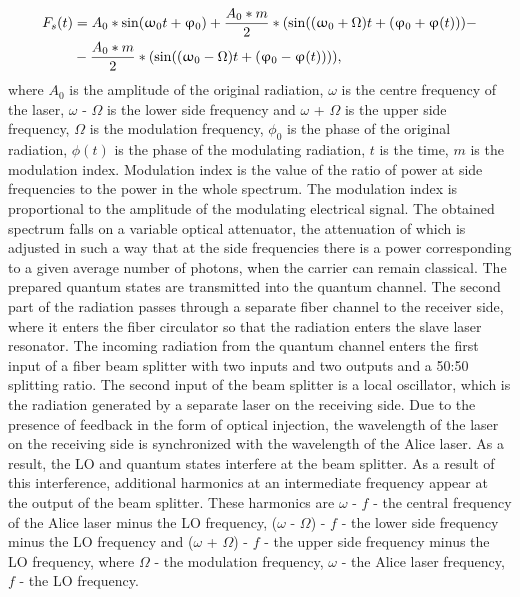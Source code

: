 {\begin{align}
\label{eq:spectrum seed}
F_s(t) & = A_0 * \sin(\omega_0 t + \phi_0) + \frac{A_0 * m}{2} * (\sin((\omega_0 + \Omega)t + (\phi_0 + \phi (t))) - \notag \\\
&- \frac{A_0 * m}{2} * (\sin((\omega_0 - \Omega)t + (\phi_0 - \phi (t)))),
\end{align} where $A_0$ is the amplitude of the original radiation, $\omega$ is the centre frequency of the laser, $\omega$ - $\Omega$ is the lower side frequency and $\omega$ + $\Omega$ is the upper side frequency, $\Omega$ is the modulation frequency, $\phi_0$ is the phase of the original radiation, $\phi(t)$ is the phase of the modulating radiation, $t$ is the time, $m$ is the modulation index. Modulation index is the value of the ratio of power at side frequencies to the power in the whole spectrum. The modulation index is proportional to the amplitude of the modulating electrical signal.  The obtained spectrum falls on a variable optical attenuator, the attenuation of which is adjusted in such a way that at the side frequencies there is a power corresponding to a given average number of photons, when the carrier can remain classical. The prepared quantum states are transmitted into the quantum channel. 
The second part of the radiation passes through a separate fiber channel to the receiver side, where it enters the fiber circulator so that the radiation enters the slave laser resonator. 
The incoming radiation from the quantum channel enters the first input of a fiber beam splitter with two inputs and two outputs and a 50:50 splitting ratio. The second input of the beam splitter is a local oscillator, which is the radiation generated by a separate laser on the receiving side. Due to the presence of feedback in the form of optical injection, the wavelength of the laser on the receiving side is synchronized with the wavelength of the Alice laser. As a result, the LO and quantum states interfere at the beam splitter. As a result of this interference, additional harmonics at an intermediate frequency appear at the output of the beam splitter. These harmonics are $\omega$ - $f$ - the central frequency of the Alice laser minus the LO frequency, ($\omega$ - $\Omega$) - $f$ - the lower side frequency minus the LO frequency and ($\omega$ + $\Omega$) - $f$ - the upper side frequency minus the LO frequency, where $\Omega$ - the modulation frequency, $\omega$ - the Alice laser frequency, $f$ - the LO frequency. 
}
